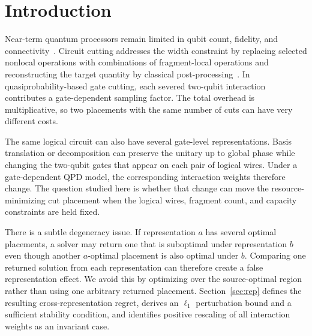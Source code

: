 \documentclass[
  aps,
  pra,
  reprint,
  amsmath,
  amssymb,
  longbibliography,
  nofootinbib,
  floatfix
]{revtex4-2}
\theoremstyle{plain}
\begin{document}
\maketitle

\section{Introduction}
\label{sec:intro}

Near-term quantum processors remain limited in qubit count, fidelity, and connectivity~\cite{preskill2018}. Circuit cutting addresses the width constraint by replacing selected nonlocal operations with combinations of fragment-local operations and reconstructing the target quantity by classical post-processing~\cite{peng2020,bravyi2016,tang2021}. In quasiprobability-based gate cutting, each severed two-qubit interaction contributes a gate-dependent sampling factor. The total overhead is multiplicative, so two placements with the same number of cuts can have very different costs.

The same logical circuit can also have several gate-level representations. Basis translation or decomposition can preserve the unitary up to global phase while changing the two-qubit gates that appear on each pair of logical wires. Under a gate-dependent QPD model, the corresponding interaction weights therefore change. The question studied here is whether that change can move the resource-minimizing cut placement when the logical wires, fragment count, and capacity constraints are held fixed.

There is a subtle degeneracy issue. If representation $a$ has several optimal placements, a solver may return one that is suboptimal under representation $b$ even though another $a$-optimal placement is also optimal under $b$. Comparing one returned solution from each representation can therefore create a false representation effect. We avoid this by optimizing over the source-optimal region rather than using one arbitrary returned placement. Section~\ref{sec:rep} defines the resulting cross-representation regret, derives an $\ell_1$ perturbation bound and a sufficient stability condition, and identifies positive rescaling of all interaction weights as an invariant case.
\end{document}
